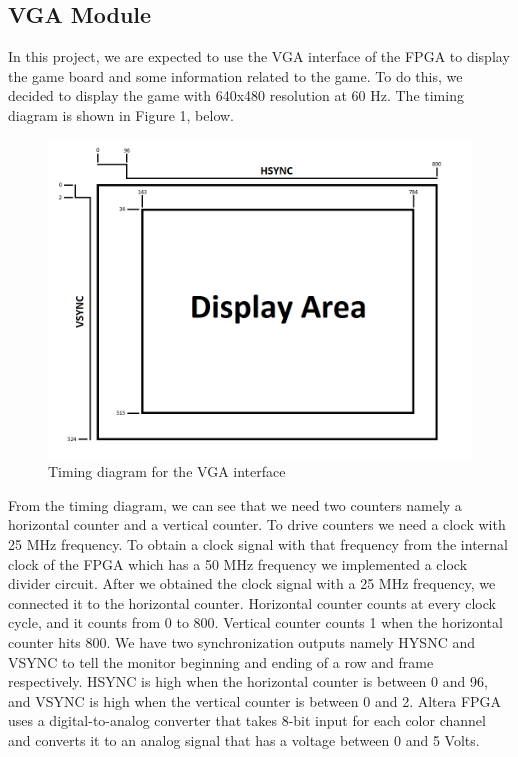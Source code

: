 \documentclass[conference]{IEEEtran}
\begin{document}
\subsection{VGA Module}
In this project, we are expected to use the VGA interface of the FPGA to display the game board and some information related to the game. 
To do this, we decided to display the game with 640x480 resolution at 60 Hz. \cite{vga} The timing diagram is shown in Figure 1, below.
\begin{figure}[H]
  \centerline{\includegraphics[scale=0.4]{vga.png}}
   \caption{Timing diagram for the VGA interface}
\end{figure} 
From the timing diagram, we can see that we need two counters namely a horizontal counter and a vertical counter.
To drive counters we need a clock with 25 MHz frequency. 
To obtain a clock signal with that frequency from the internal clock of the FPGA which has a 50 MHz frequency we implemented a clock divider circuit. 
After we obtained the clock signal with a 25 MHz frequency, we connected it to the horizontal counter. 
Horizontal counter counts at every clock cycle, and it counts from 0 to 800. Vertical counter counts 1 when the horizontal counter hits 800. 
We have two synchronization outputs namely HYSNC and VSYNC to tell the monitor beginning and ending of a row and frame respectively. 
HSYNC is high when the horizontal counter is between 0 and 96, and VSYNC is high when the vertical counter is between 0 and 2. 
Altera FPGA uses a digital-to-analog converter that takes 8-bit input for each color channel and converts it to an analog signal that has a voltage between 
0 and 5 Volts. \cite{fpga} \\
\end{document}
